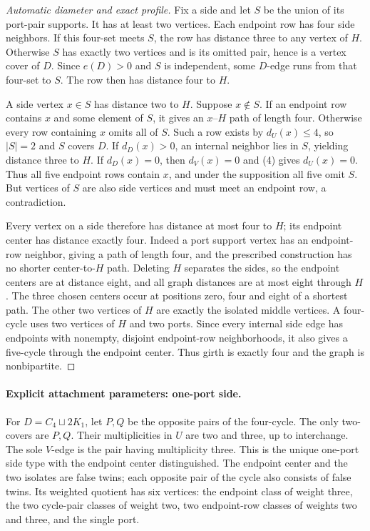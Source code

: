 \documentclass[11pt]{article}
\begin{document}
\begin{proof}[Automatic diameter and exact profile]
Fix a side and let $S$ be the union of its port-pair supports.
It has at least two vertices. Each endpoint row has four side
neighbors. If this four-set meets $S$, the row has distance three
to any vertex of $H$. Otherwise $S$ has exactly two vertices and
is its omitted pair, hence is a vertex cover of $D$. Since $e(D)>0$
and $S$ is independent, some $D$-edge runs from that four-set to
$S$. The row then has distance four to $H$.

A side vertex $x\in S$ has distance two to $H$. Suppose $x\notin S$.
If an endpoint row contains $x$ and some element of $S$, it gives
an $x$--$H$ path of length four. Otherwise every row containing $x$
omits all of $S$. Such a row exists by $d_U(x)\leq4$, so $|S|=2$
and $S$ covers $D$. If $d_D(x)>0$, an internal neighbor lies in
$S$, yielding distance three to $H$. If $d_D(x)=0$, then
$d_V(x)=0$ and (4) gives $d_U(x)=0$. Thus all five endpoint rows
contain $x$, and under the supposition all five omit $S$. But
vertices of $S$ are also side vertices and must meet an endpoint
row, a contradiction.

Every vertex on a side therefore has distance at most four to $H$;
its endpoint center has distance exactly four. Indeed a port support
vertex has an endpoint-row neighbor, giving a path of length four,
and the prescribed construction has no shorter center-to-$H$ path.
Deleting $H$ separates the sides, so the endpoint centers are at
distance eight, and all graph distances are at most eight through
$H$. The three chosen centers occur at positions zero, four and
eight of a shortest path. The other two vertices of $H$ are exactly
the isolated middle vertices. A four-cycle uses two vertices of $H$
and two ports. Since every internal side edge has endpoints with
nonempty, disjoint endpoint-row neighborhoods, it also gives a
five-cycle through the endpoint center. Thus girth is exactly four
and the graph is nonbipartite.
\end{proof}

\paragraph{Explicit attachment parameters: one-port side.}
For $D=C_4\sqcup2K_1$, let $P,Q$ be the opposite pairs of the
four-cycle. The only two-covers are $P,Q$. Their multiplicities in
$U$ are two and three, up to interchange. The sole $V$-edge is
the pair having multiplicity three. This is the unique one-port
side type with the endpoint center distinguished. The endpoint
center and the two isolates are false twins; each opposite pair
of the cycle also consists of false twins. Its weighted quotient
has six vertices: the endpoint class of weight three, the two
cycle-pair classes of weight two, two endpoint-row classes of
weights two and three, and the single port.
\end{document}
